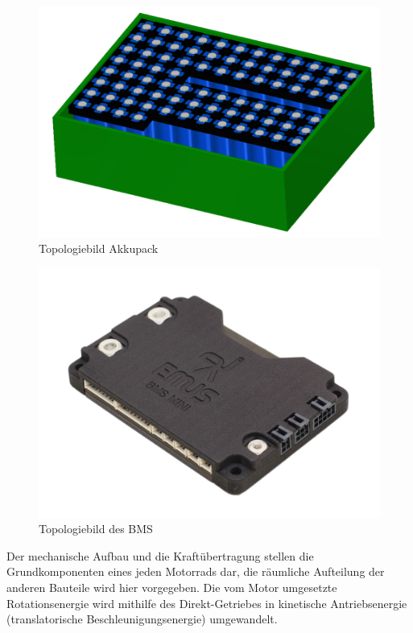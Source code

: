 \begin{figure} [H]
	\begin{center}
		\includegraphics[scale=0.75] {figures/Akku/Akkubox1.PNG}
		\caption{Topologiebild Akkupack}
	\end{center}
\end{figure}

\begin{figure} [H]
	\begin{center}
		\includegraphics[scale=0.2] {figures/Akku/BMSMINI.jpg}
		\caption{Topologiebild des BMS}
	\end{center}
\end{figure}

Der mechanische Aufbau und die Kraftübertragung stellen die Grundkomponenten eines jeden Motorrads dar, die räumliche Aufteilung der anderen Bauteile wird hier vorgegeben. Die vom Motor umgesetzte Rotationsenergie wird mithilfe des Direkt-Getriebes in kinetische Antriebsenergie (translatorische Beschleunigungsenergie) umgewandelt.

